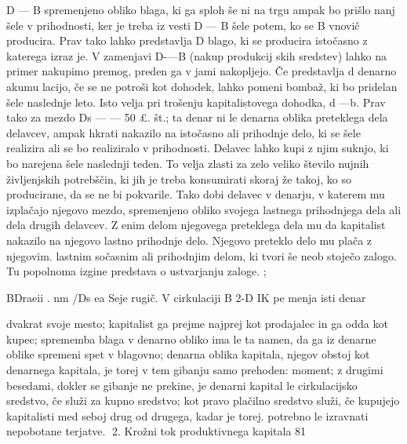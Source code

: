 \documentclass[kapital_02.tex]{subfiles}
\begin{document}
 D — B spremenjeno obliko blaga, ki ga sploh še ni na trgu ampak bo prišlo nanj šele v prihodnosti, ker je treba iz vesti D — B šele potem, ko se B vnovič producira. Prav tako lahko predstavlja D blago, ki se producira istočasno z katerega izraz je. V zamenjavi D-—B (nakup produkcij skih sredstev) lahko na primer nakupimo premog, preden ga v jami nakopljejo. Če predstavlja d denarno akumu lacijo, če se ne potroši kot dohodek, lahko pomeni bombaž, ki bo pridelan šele naslednje leto. Isto velja pri trošenju kapitalistovega dohodka, d —b. Prav tako za mezdo Ds — — 50 £. št.; ta denar ni le denarna oblika preteklega dela delavcev, ampak hkrati nakazilo na istočasno ali prihodnje delo, ki se šele realizira ali se bo realiziralo v prihodnosti. Delavec lahko kupi z njim suknjo, ki bo narejena šele naslednji teden. To velja zlasti za zelo veliko število nujnih življenjskih potrebščin, ki jih je treba konsumirati skoraj že takoj, ko so producirane, da se ne bi pokvarile. Tako dobi delavec v denarju, v katerem mu izplačajo njegovo mezdo, spremenjeno obliko svojega lastnega prihodnjega dela ali dela drugih delavcev. Z enim delom njegovega preteklega dela mu da kapitalist nakazilo na njegovo lastno prihodnje delo. Njegovo preteklo delo mu plača z njegovim. lastnim sočasnim ali prihodnjim delom, ki tvori še neob stoječo zalogo. Tu popolnoma izgine predstava o ustvarjanju zaloge. ;

BDraeii . nm /Ds ea Seje rugič. V cirkulaciji B 2-D IK pe menja isti denar

dvakrat svoje mesto; kapitalist ga prejme najprej kot prodajalec in ga odda kot kupec; sprememba blaga v denarno obliko ima le ta namen, da ga iz denarne oblike spremeni spet v blagovno; denarna oblika kapitala, njegov obstoj kot denarnega kapitala, je torej v tem gibanju samo prehoden: moment; z drugimi besedami, dokler se gibanje ne prekine, je denarni kapital le cirkulacijsko sredstvo, če služi za kupno sredstvo; kot pravo plačilno sredstvo služi, če kupujejo kapitalisti med seboj drug od drugega, kadar je torej. potrebno le izravnati nepobotane terjatve. 2. Krožni tok produktivnega kapitala 81
\end{document}
